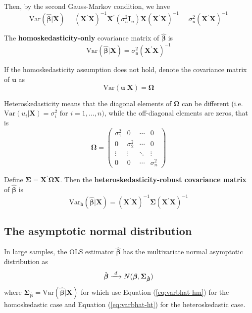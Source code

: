 \documentclass[a4paper,11pt]{article}
\newcommand{\var}{\mathrm{Var}}
\newcommand{\rarrowd}[1]{\xrightarrow{\text{ \textit #1 }}}
\begin{document}
Then, by the second Gauss-Markov condition, we have
\begin{equation*}
\var(\hat{\boldsymbol{\beta}} | \mathbf{X}) = \left(\mathbf{X}^{\prime} \mathbf{X}\right)^{-1} \mathbf{X}^{\prime} (\sigma^2_u \mathbf{I}_n) \mathbf{X} (\mathbf{X}^{\prime} \mathbf{X})^{-1} = \sigma^2_u (\mathbf{X}^{\prime} \mathbf{X})^{-1}
\end{equation*}

The \textbf{homoskedasticity-only} covariance matrix of \(\hat{\boldsymbol{\beta}}\) is
\begin{equation}
\label{eq:varbhat-hm}
\var(\hat{\boldsymbol{\beta}} | \mathbf{X}) = \sigma^2_u (\mathbf{X}^{\prime} \mathbf{X})^{-1}
\end{equation}

If the homoskedasticity assumption does not hold, denote the
covariance matrix of \(\mathbf{u}\) as
\[ \var(\mathbf{u} | \mathbf{X}) = \mathbf{\Omega} \]

Heteroskedasticity means that the diagonal elements of
\(\mathbf{\Omega}\) can be different (i.e. \(\var(u_i | \mathbf{X}) =
\sigma^2_i \text{ for } i=1, \ldots, n)\), while the off-diagonal
elements are zeros, that is
\begin{equation*}
\mathbf{\Omega} =
\begin{pmatrix}
\sigma^2_1 & 0 & \cdots & 0 \\
0 & \sigma^2_2 & \cdots & 0 \\
\vdots & \vdots & \ddots & \vdots \\
0 & 0 & \cdots & \sigma^2_n
\end{pmatrix}
\end{equation*}

Define \(\mathbf{\Sigma} = \mathbf{X}^{\prime} \mathbf{\Omega}
\mathbf{X}\). Then the \textbf{heteroskedasticity-robust covariance matrix} of
\(\hat{\boldsymbol{\beta}}\) is
\begin{equation}
\label{eq:varbhat-ht}
\var_{\mathrm{h}}(\hat{\boldsymbol{\beta}} | \mathbf{X}) = \left(\mathbf{X}^{\prime} \mathbf{X}\right)^{-1} \mathbf{\Sigma} (\mathbf{X}^{\prime} \mathbf{X})^{-1}
\end{equation}


\subsection{The asymptotic normal distribution}
\label{sec:org027f012}

In large samples, the OLS estimator \(\hat{\boldsymbol{\beta}}\) has the
multivariate normal asymptotic distribution as
\begin{equation}
\label{eq:normal-bhat-m}
\hat{\boldsymbol{\beta}} \rarrowd{d} N(\boldsymbol{\beta}, \mathbf{\Sigma_{\hat{\boldsymbol{\beta}}}})
\end{equation}
where \(\mathbf{\Sigma_{\hat{\boldsymbol{\beta}}}} =
\var(\hat{\boldsymbol{\beta}} | \mathbf{X})\) for which use
Equation (\ref{eq:varbhat-hm}) for the homoskedastic case and Equation
(\ref{eq:varbhat-ht}) for the heteroskedastic case.
\end{document}
